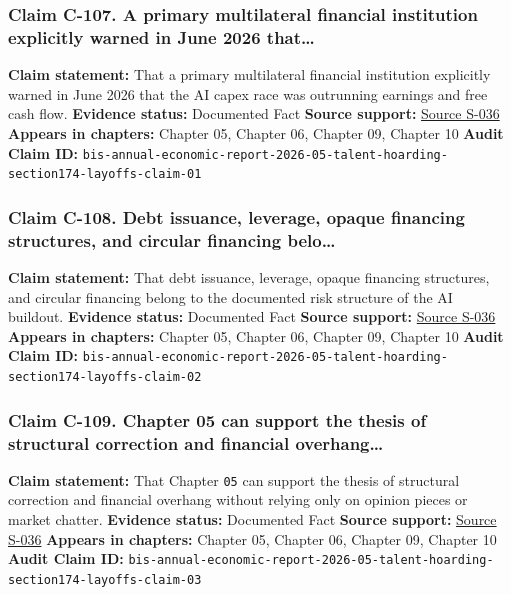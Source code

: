\documentclass[
  american,
  11pt,
  letterpaper,
]{article}
\begin{document}
\subsubsection{Claim C-107. A primary multilateral financial institution
explicitly warned in June 2026
that\ldots{}}\label{claim-c-107-a-primary-multilateral-financial-institution-explicitly-warned-in-june-2026-that}

\textbf{Claim statement:} That a primary multilateral financial
institution explicitly warned in June 2026 that the AI capex race was
outrunning earnings and free cash flow. \textbf{Evidence status:}
Documented Fact \textbf{Source support:}
\hyperref[source-s-036-annual-economic-report-2026]{Source S-036}
\textbf{Appears in chapters:} Chapter 05, Chapter 06, Chapter 09,
Chapter 10 \textbf{Audit Claim ID:}
\texttt{bis-annual-economic-report-2026-05-talent-hoarding-section174-layoffs-claim-01}

\subsubsection{Claim C-108. Debt issuance, leverage, opaque financing
structures, and circular financing
belo\ldots{}}\label{claim-c-108-debt-issuance-leverage-opaque-financing-structures-and-circular-financing-belo}

\textbf{Claim statement:} That debt issuance, leverage, opaque financing
structures, and circular financing belong to the documented risk
structure of the AI buildout. \textbf{Evidence status:} Documented Fact
\textbf{Source support:}
\hyperref[source-s-036-annual-economic-report-2026]{Source S-036}
\textbf{Appears in chapters:} Chapter 05, Chapter 06, Chapter 09,
Chapter 10 \textbf{Audit Claim ID:}
\texttt{bis-annual-economic-report-2026-05-talent-hoarding-section174-layoffs-claim-02}

\subsubsection{Claim C-109. Chapter 05 can support the thesis of
structural correction and financial
overhang\ldots{}}\label{claim-c-109-chapter-05-can-support-the-thesis-of-structural-correction-and-financial-overhang}

\textbf{Claim statement:} That Chapter \texttt{05} can support the
thesis of structural correction and financial overhang without relying
only on opinion pieces or market chatter. \textbf{Evidence status:}
Documented Fact \textbf{Source support:}
\hyperref[source-s-036-annual-economic-report-2026]{Source S-036}
\textbf{Appears in chapters:} Chapter 05, Chapter 06, Chapter 09,
Chapter 10 \textbf{Audit Claim ID:}
\texttt{bis-annual-economic-report-2026-05-talent-hoarding-section174-layoffs-claim-03}
\end{document}
